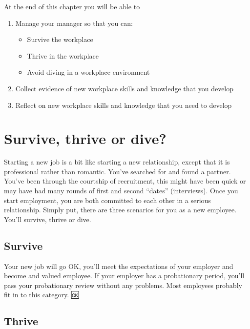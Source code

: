\documentclass[
]{book}
\providecommand{\tightlist}{%
  \setlength{\itemsep}{0pt}\setlength{\parskip}{0pt}}
\begin{document}
At the end of this chapter you will be able to

\begin{enumerate}
\def\labelenumi{\arabic{enumi}.}
\tightlist
\item
  Manage your manager so that you can:

  \begin{itemize}
  \tightlist
  \item
    Survive the workplace
  \item
    Thrive in the workplace
  \item
    Avoid diving in a workplace environment
  \end{itemize}
\item
  Collect evidence of new workplace skills and knowledge that you develop
\item
  Reflect on new workplace skills and knowledge that you need to develop
\end{enumerate}

\hypertarget{scenarios}{%
\section{Survive, thrive or dive?}\label{scenarios}}

Starting a new job is a bit like starting a new relationship, except that it is professional rather than romantic. You've searched for and found a partner. You've been through the courtship of recruitment, this might have been quick or may have had many rounds of first and second ``dates'' (interviews). Once you start employment, you are both committed to each other in a serious relationship. Simply put, there are three scenarios for you as a new employee. You'll survive, thrive or dive.

\hypertarget{survive}{%
\subsection{Survive}\label{survive}}

Your new job will go OK, you'll meet the expectations of your employer and become and valued employee. If your employer has a probationary period, you'll pass your probationary review without any problems. Most employees probably fit in to this category. 🆗

\hypertarget{thrive}{%
\subsection{Thrive}\label{thrive}}
\end{document}
